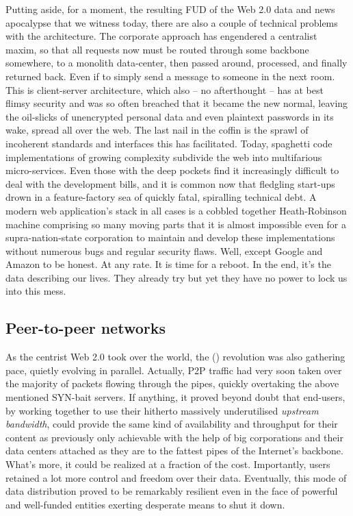 Putting aside, for a moment, the resulting FUD of the Web 2.0 data and news apocalypse that we witness today, there are also a couple of technical problems with the architecture. The corporate approach has engendered a centralist maxim, so that all requests now must be routed through some backbone somewhere, to a monolith data-center, then passed around, processed, and finally returned back. Even if to simply send a message to someone in the next room. This is client-server architecture, which also – no afterthought – has at best flimsy security and was so often breached that it became the new normal, leaving the oil-slicks of unencrypted personal data and even plaintext passwords in its wake, spread all over the web. The last nail in the coffin is the sprawl of incoherent standards and interfaces this has facilitated. Today, spaghetti code implementations of growing complexity subdivide the web into multifarious micro-services. Even those with the deep pockets find it increasingly difficult to deal with the development bills, and it is common now that fledgling start-ups drown in a feature-factory sea of quickly fatal, spiralling technical debt. A modern web application's stack in all cases is a cobbled together Heath-Robinson machine comprising so many moving parts that it is almost impossible even for a supra-nation-state corporation to maintain and develop these implementations without numerous bugs and regular security flaws. Well, except Google and Amazon to be honest. At any rate. It is time for a reboot. In the end, it's the data describing our lives. They already try but yet they have no power to lock us into this mess.


\subsection{Peer-to-peer networks \statusgreen}\label{sec:peer_to_peer}

As the centrist Web 2.0 took over the world, the  () revolution was also gathering pace, quietly evolving in parallel. Actually, P2P traffic had very soon taken over the majority of packets flowing through the pipes, quickly overtaking the above mentioned SYN-bait servers. If anything, it proved beyond doubt that end-users, by working together to use their hitherto massively underutilised \emph{upstream bandwidth}, could provide the same kind of availability and throughput for their content as previously only achievable with the help of big corporations and their  data centers attached as they are to the fattest pipes of the Internet's backbone. What's more, it could be realized at a fraction of the cost. Importantly, users retained a lot more control and freedom over their data. Eventually, this mode of data distribution proved to be remarkably resilient even in the face of powerful and well-funded entities exerting desperate means to shut it down.

